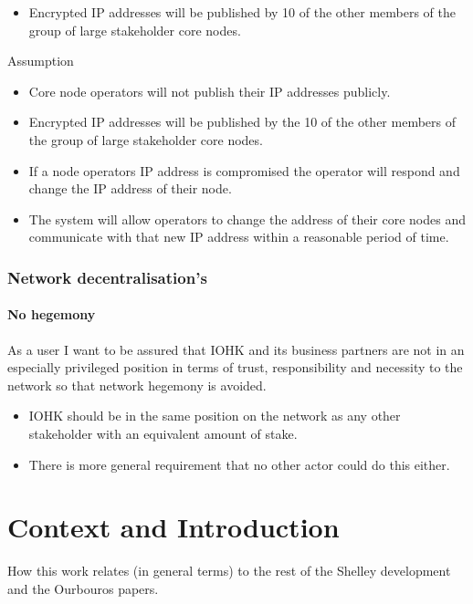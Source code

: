 \documentclass{report}
\theoremstyle{definition}{
  \newtheorem{lemma}{Lemma}[section] %
  \newtheorem{definition}[lemma]{Definition}
}
\theoremstyle{theorem}{
  \newtheorem{invariant}[lemma]{Invariant}
  \newtheorem{proofobligation}[lemma]{Proof Obligation}
}
\numberwithin{equation}{lemma}
\begin{document}
\begin{itemize}
\item Encrypted IP addresses will be published by 10 of the other members of
      the group of large stakeholder core nodes.
\end{itemize}

Assumption

\begin{itemize}
\item Core node operators will not publish their IP addresses publicly.
\item Encrypted IP addresses will be published by the 10 of the other members
      of the group of large stakeholder core nodes.
\item If a node operators IP address is compromised the operator will respond
      and change the IP address of their node.
\item The system will allow operators to change the address of their core nodes
      and communicate with that new IP address within a reasonable period of
      time.
\end{itemize}


\subsubsection{Network decentralisation's}

\paragraph{No hegemony}

As a user I want to be assured that IOHK and its business partners are not in
an especially privileged position in terms of trust, responsibility and
necessity to the network so that network hegemony is avoided.

\begin{itemize}
\item IOHK should be in the same position on the network as any other
      stakeholder with an equivalent amount of stake.
\item There is more general requirement that no other actor could do this
      either.
\end{itemize}

\section{Context and Introduction}

How this work relates (in general terms) to the rest of the Shelley
development and the Ourbouros papers.
\end{document}
